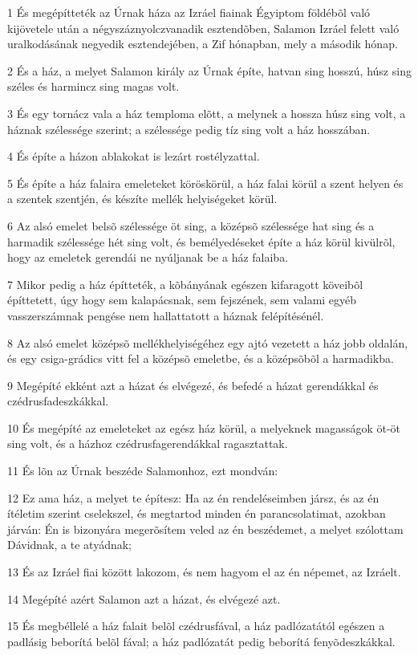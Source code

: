 \par 1 És megépítteték az Úrnak háza az Izráel fiainak Égyiptom földébõl való kijövetele után a négyszáznyolczvanadik esztendõben, Salamon Izráel felett való uralkodásának negyedik esztendejében, a Zif hónapban, mely a második hónap.
\par 2 És a ház, a melyet Salamon király az Úrnak építe, hatvan sing hosszú, húsz sing széles és harmincz sing magas volt.
\par 3 És egy tornácz vala a ház temploma elõtt, a melynek a hossza húsz sing volt, a háznak szélessége szerint; a szélessége pedig tíz sing volt a ház hosszában.
\par 4 És építe a házon ablakokat is lezárt rostélyzattal.
\par 5 És építe a ház falaira emeleteket köröskörül, a ház falai körül a szent helyen és a szentek szentjén, és készíte mellék helyiségeket körül.
\par 6 Az alsó emelet belsõ szélessége öt sing, a középsõ szélessége hat sing és a harmadik szélessége hét sing volt, és bemélyedéseket építe a ház körül kivülrõl, hogy az emeletek gerendái ne nyúljanak be a ház falaiba.
\par 7 Mikor pedig a ház építteték, a kõbányának egészen kifaragott köveibõl építtetett, úgy hogy sem kalapácsnak, sem fejszének, sem valami egyéb vasszerszámnak pengése nem hallattatott a háznak felépítésénél.
\par 8 Az alsó emelet középsõ mellékhelyiségéhez egy ajtó vezetett a ház jobb oldalán, és egy csiga-grádics vitt fel a középsõ emeletbe, és a középsõbõl a harmadikba.
\par 9 Megépíté ekként azt a házat és elvégezé, és befedé a házat gerendákkal és czédrusfadeszkákkal.
\par 10 És megépíté az emeleteket az egész ház körül, a melyeknek magasságok öt-öt sing volt, és a házhoz czédrusfagerendákkal ragasztattak.
\par 11 És lõn az Úrnak beszéde Salamonhoz, ezt mondván:
\par 12 Ez ama ház, a melyet te építesz: Ha az én rendeléseimben  jársz, és az én ítéletim szerint cselekszel, és megtartod minden én parancsolatimat, azokban járván: Én is bizonyára megerõsítem veled az én beszédemet, a melyet szólottam Dávidnak, a te atyádnak;
\par 13 És az Izráel fiai között lakozom, és nem hagyom el az én népemet, az Izráelt.
\par 14 Megépíté azért Salamon azt a házat, és elvégezé azt.
\par 15 És megbéllelé a ház falait belõl czédrusfával, a ház padlózatától egészen a padlásig beborítá belõl fával; a ház padlózatát pedig beborítá fenyõdeszkákkal.
